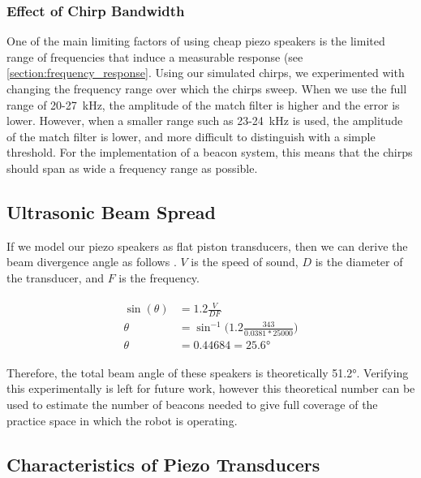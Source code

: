 \documentclass{article}
\begin{document}
    \subsubsection{Effect of Chirp Bandwidth}

      One of the main limiting factors of using cheap piezo speakers is the limited range of frequencies that induce a measurable response (see \ref{section:frequency_response}. Using our simulated chirps, we experimented with changing the frequency range over which the chirps sweep. When we use the full range of 20-27\SI{}{\kilo\hertz}, the amplitude of the match filter is higher and the error is lower. However, when a smaller range such as 23-24\SI{}{\kilo\hertz} is used, the amplitude of the match filter is lower, and more difficult to distinguish with a simple threshold. For the implementation of a beacon system, this means that the chirps should span as wide a frequency range as possible.

  \subsection{Ultrasonic Beam Spread}

    If we model our piezo speakers as flat piston transducers, then we can derive the beam divergence angle as follows \cite{bond_beam_2001}. $V$ is the speed of sound, $D$ is the diameter of the transducer, and $F$ is the frequency.

    \begin{align} \label{eq:beam_divergence}
      \begin{split}
        \sin(\theta) &= 1.2\frac{V}{DF} \\
        \theta &= \sin^{-1}\bigg(1.2\frac{343}{0.0381*25000}\bigg) \\
        \theta &= 0.44684 = \ang{25.6}
      \end{split}
    \end{align}

    Therefore, the total beam angle of these speakers is theoretically \ang{51.2}. Verifying this experimentally is left for future work, however this theoretical number can be used to estimate the number of beacons needed to give full coverage of the practice space in which the robot is operating.

  \subsection{Characteristics of Piezo Transducers}
\end{document}
